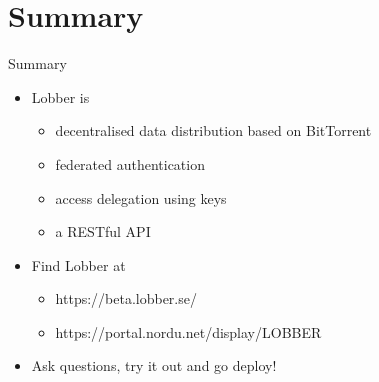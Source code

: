 \documentclass{beamer}
\begin{document}
\section*{Summary}

\begin{frame}{Summary}
  \begin{itemize}
  \item
    Lobber is
    \begin{itemize}
    \item
      decentralised data distribution based on BitTorrent
    \item
      federated authentication 
    \item
      access delegation using keys
    \item
      a RESTful API
    \end{itemize}
  \item
    Find Lobber at
    \begin{itemize}
    \item
      https://beta.lobber.se/
    \item
      https://portal.nordu.net/display/LOBBER
    \end{itemize}
  \item
    Ask questions, try it out and go deploy!
  \end{itemize}
\end{frame}  
\end{document}
